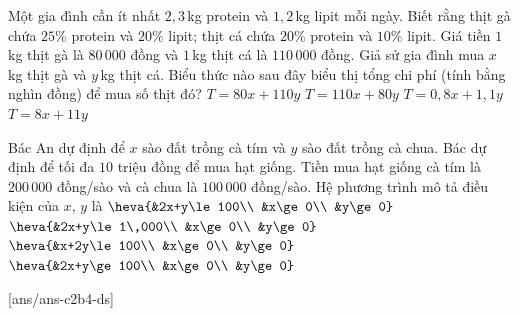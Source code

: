 \begin{ex}%
	Một gia đình cần ít nhất $2{,}3$\,kg protein và $1{,}2$\,kg lipit mỗi ngày. Biết rằng thịt gà chứa $25\%$ protein và $20\%$ lipit; thịt cá chứa $20\%$ protein và $10\%$ lipit. Giá tiền $1$\,kg thịt gà là $80\,000$ đồng và $1$\,kg thịt cá là $110\,000$ đồng. Giả sử gia đình mua $x$\,kg thịt gà và $y$\,kg thịt cá. Biểu thức nào sau đây biểu thị tổng chi phí (tính bằng nghìn đồng) để mua số thịt đó?
	\choice
	{\True $T=80x+110y$}
	{$T=110x+80y$}
	{$T=0{,}8x+1{,}1y$}
	{$T=8x+11y$}
\end{ex}
\begin{ex}%
	Bác An dự định để $x$ sào đất trồng cà tím và $y$ sào đất trồng cà chua. Bác dự định để tối đa $10$ triệu đồng để mua hạt giống. Tiền mua hạt giống cà tím là $200\,000$ đồng/sào và cà chua là $100\,000$ đồng/sào. Hệ phương trình mô tả điều kiện của $x$, $y$ là
	\choice
	{\True $\heva{&2x+y\le 100\\ &x\ge 0\\ &y\ge 0}$}
	{$\heva{&2x+y\le 1\,000\\ &x\ge 0\\ &y\ge 0}$}
	{$\heva{&x+2y\le 100\\ &x\ge 0\\ &y\ge 0}$}
	{$\heva{&2x+y\ge 100\\ &x\ge 0\\ &y\ge 0}$}
\end{ex}
 
\setcounter{ex}{0}
[ans/ans-c2b4-ds]
